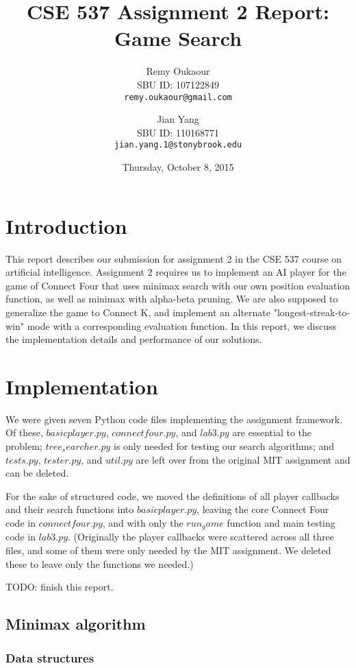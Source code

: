 \documentclass[11pt]{article}
\title{CSE 537 Assignment 2 Report: Game Search}
\author{
Remy Oukaour \\
	{\small SBU ID: 107122849}\\
	{\small \texttt{remy.oukaour@gmail.com}}
\and
Jian Yang \\
	{\small SBU ID: 110168771}\\
	{\small \texttt{jian.yang.1@stonybrook.edu}}
}
\date{Thursday, October 8, 2015}
\begin{document}
\maketitle

\section{Introduction}

This report describes our submission for assignment 2 in the CSE 537 course on
artificial intelligence. Assignment 2 requires us to implement an AI player
for the game of Connect Four that uses minimax search with our own position
evaluation function, as well as minimax with alpha-beta pruning. We are also
supposed to generalize the game to Connect K, and implement an alternate
"longest-streak-to-win" mode with a corresponding evaluation function.
In this report, we discuss the implementation details and performance of
our solutions.

\section{Implementation}

We were given seven Python code files implementing the assignment framework.
Of these, \(basicplayer.py\), \(connectfour.py\), and \(lab3.py\) are essential
to the problem; \(tree_searcher.py\) is only needed for testing our search
algorithms; and \(tests.py\), \(tester.py\), and \(util.py\) are left over
from the original MIT assignment and can be deleted.

For the sake of structured code, we moved the definitions of all player
callbacks and their search functions into \(basicplayer.py\), leaving the core
Connect Four code in \(connectfour.py\), and with only the \(run_game\)
function and main testing code in \(lab3.py\). (Originally the player callbacks
were scattered across all three files, and some of them were only needed by
the MIT assignment. We deleted these to leave only the functions we needed.)

TODO: finish this report.

\subsection{Minimax algorithm}

\subsubsection{Data structures}
\end{document}
